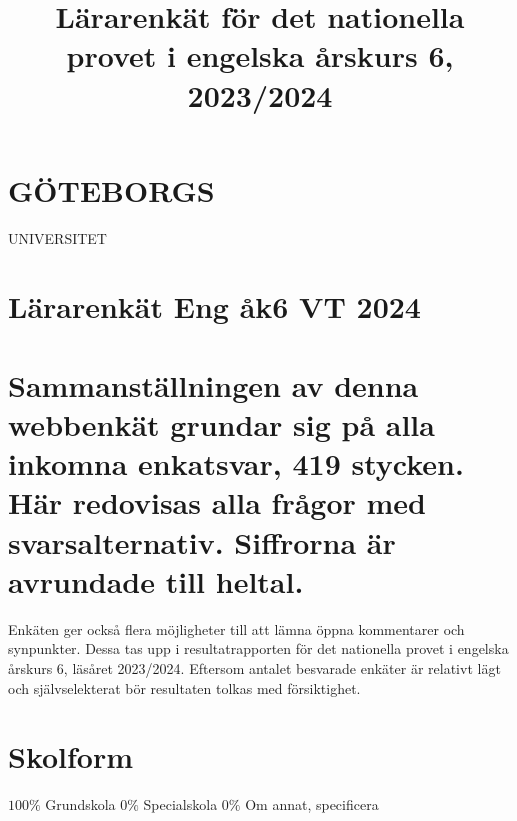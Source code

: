 \title{
Lärarenkät för det nationella provet i engelska årskurs 6, 2023/2024
}
\section*{GÖTEBORGS}
UNIVERSITET
\section*{Lärarenkät Eng åk6 VT 2024}
\section*{Sammanställningen av denna webbenkät grundar sig på alla inkomna enkatsvar, 419 stycken. Här redovisas alla frågor med svarsalternativ. Siffrorna är avrundade till heltal.}
Enkäten ger också flera möjligheter till att lämna öppna kommentarer och synpunkter. Dessa tas upp i resultatrapporten för det nationella provet i engelska årskurs 6, läsåret 2023/2024.
Eftersom antalet besvarade enkäter är relativt lägt och självselekterat bör resultaten tolkas med försiktighet.
\section*{Skolform}
\(100 \%\) Grundskola
\(0 \%\) Specialskola
\(0 \%\) Om annat, specificera
